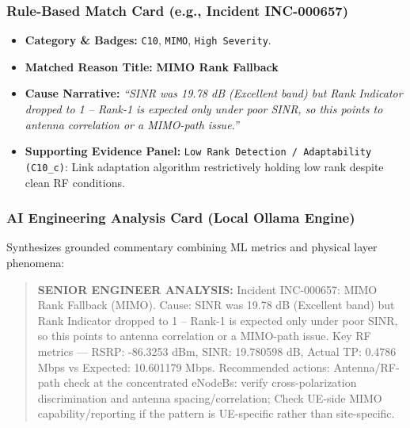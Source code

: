 \documentclass[12pt,a4paper]{report}
\begin{document}
\subsubsection{Rule-Based Match Card (e.g., Incident INC-000657)}
\begin{itemize}
    \item \textbf{Category \& Badges:} \texttt{C10}, \texttt{MIMO}, \texttt{High Severity}.
    \item \textbf{Matched Reason Title:} \textbf{MIMO Rank Fallback}
    \item \textbf{Cause Narrative:} \textit{``SINR was 19.78 dB (Excellent band) but Rank Indicator dropped to 1 -- Rank-1 is expected only under poor SINR, so this points to antenna correlation or a MIMO-path issue.''}
    \item \textbf{Supporting Evidence Panel:} \texttt{Low Rank Detection / Adaptability (C10\_c)}: Link adaptation algorithm restrictively holding low rank despite clean RF conditions.
\end{itemize}

\subsubsection{AI Engineering Analysis Card (Local Ollama Engine)}
Synthesizes grounded commentary combining ML metrics and physical layer phenomena:
\begin{quote}
\small
\textbf{SENIOR ENGINEER ANALYSIS:} Incident INC-000657: MIMO Rank Fallback (MIMO). Cause: SINR was 19.78 dB (Excellent band) but Rank Indicator dropped to 1 -- Rank-1 is expected only under poor SINR, so this points to antenna correlation or a MIMO-path issue. Key RF metrics — RSRP: -86.3253 dBm, SINR: 19.780598 dB, Actual TP: 0.4786 Mbps vs Expected: 10.601179 Mbps. Recommended actions: Antenna/RF-path check at the concentrated eNodeBs: verify cross-polarization discrimination and antenna spacing/correlation; Check UE-side MIMO capability/reporting if the pattern is UE-specific rather than site-specific.
\end{quote}
\end{document}
